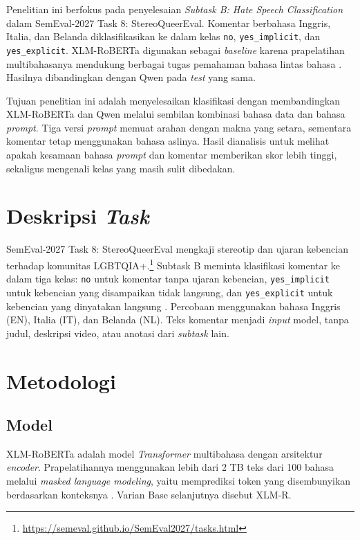 \documentclass[11pt]{article}
\begin{document}
Penelitian ini berfokus pada penyelesaian \textit{Subtask B: Hate Speech Classification} dalam SemEval-2027 Task 8: StereoQueerEval. Komentar berbahasa Inggris, Italia, dan Belanda diklasifikasikan ke dalam kelas \texttt{no}, \texttt{yes\_implicit}, dan \texttt{yes\_explicit}. XLM-RoBERTa digunakan sebagai \textit{baseline} karena prapelatihan multibahasanya mendukung berbagai tugas pemahaman bahasa lintas bahasa \citep{conneau-etal-2020-unsupervised}. Hasilnya dibandingkan dengan Qwen pada \textit{test} yang sama.

Tujuan penelitian ini adalah menyelesaikan klasifikasi dengan membandingkan XLM-RoBERTa dan Qwen melalui sembilan kombinasi bahasa data dan bahasa \textit{prompt}. Tiga versi \textit{prompt} memuat arahan dengan makna yang setara, sementara komentar tetap menggunakan bahasa aslinya. Hasil dianalisis untuk melihat apakah kesamaan bahasa \textit{prompt} dan komentar memberikan skor lebih tinggi, sekaligus mengenali kelas yang masih sulit dibedakan.

\section{Deskripsi \textit{Task}}
SemEval-2027 Task 8: StereoQueerEval mengkaji stereotip dan ujaran kebencian terhadap komunitas LGBTQIA+.\footnote{\url{https://semeval.github.io/SemEval2027/tasks.html}} Subtask B meminta klasifikasi komentar ke dalam tiga kelas: \texttt{no} untuk komentar tanpa ujaran kebencian, \nolinkurl{yes_implicit} untuk kebencian yang disampaikan tidak langsung, dan \nolinkurl{yes_explicit} untuk kebencian yang dinyatakan langsung \citep{stereoqueereval-2026-data}. Percobaan menggunakan bahasa Inggris (EN), Italia (IT), dan Belanda (NL). Teks komentar menjadi \textit{input} model, tanpa judul, deskripsi video, atau anotasi dari \textit{subtask} lain.

\section{Metodologi}
\subsection{Model}
XLM-RoBERTa adalah model \textit{Transformer} multibahasa dengan arsitektur \textit{encoder}. Prapelatihannya menggunakan lebih dari 2 TB teks dari 100 bahasa melalui \textit{masked language modeling}, yaitu memprediksi token yang disembunyikan berdasarkan konteksnya \citep{conneau-etal-2020-unsupervised}. Varian Base selanjutnya disebut XLM-R.
\end{document}
